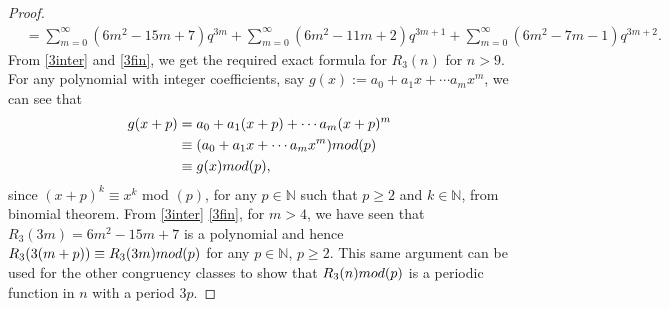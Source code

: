 \documentclass[10pt,a4paper]{amsart}
\begin{document}
\begin{proof}
\begin{align}
			&= \sum_{m=0}^{\infty} \left( 6m^2 -15m + 7 \right) q^{3m} +\sum_{m=0}^{\infty} \left( 6m^2 -11m + 2 \right) q^{3m+1} + \sum_{m=0}^{\infty} \left( 6m^2 -7m - 1 \right) q^{3m+2}. \label{3fin}
		\end{align}
		From \eqref{3inter} and \eqref{3fin}, we get the required exact formula for $R_3(n)$ for $n>9$. For any polynomial with integer coefficients, say $g(x):=a_0 + a_1 x + \cdots a_m x^m$, we can see that
		\begin{align*}
			g(x+p) &= a_0 + a_1 (x+p) + \cdots a_m (x+p)^m\\
			&\equiv (a_0 + a_1 x + \cdots a_m x^m) \textup{ mod (p)}\\
			&\equiv g(x) \textup{ mod (p)},
		\end{align*}
		since $(x+p)^k \equiv x^k$ mod $(p)$, for any $p \in \mathbb{N}$ such that $p\geq2$ and $k \in \mathbb{N}$, from binomial theorem. From \eqref{3inter} \eqref{3fin}, for $m>4$, we have seen that $R_3(3m) = 6m^2 -15m+7$ is a polynomial and hence $R_3(3(m+p)) \equiv R_3(3m) \textup{ mod (p)}$ for any $p \in \mathbb{N}$, $ p\geq2$. This same argument can be used for the other congruency classes to show that $R_3(n) \textup{ mod (p)}$ is a periodic function in $n$ with a period $3p$.
	\end{proof}
\end{document}
